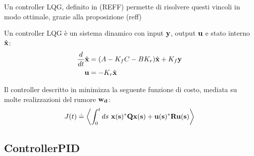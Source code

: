 Un controller \textsc{LQG}, definito in (REFF) permette di risolvere questi vincoli in modo ottimale, grazie
alla proposizione (reff) %
\begin{framed} %
  Un controller \textsc{LQG} è un sistema dinamico con input $\bf y$, output $\bf u$ e stato interno
  $\hat{\bf x}$:
  \begin{equation}\label{eq:lqg}
    \begin{aligned}[c]
      \frac d {dt} \hat {\bf x} &= (A-K_f C - B K_r) \hat{\bf x} + K_f \bf y \\ %
      \bf u               &= -K_r \hat{\bf x}
    \end{aligned}
  \end{equation}
\end{framed}
\begin{framed} %
  Il controller descritto in %
  minimizza la seguente funzione di costo, mediata su molte realizzazioni del rumore $\bf w_d$:
  \begin{equation}\label{eq:lqg-costo}
    J(t) \doteq \left<
      \int_0^t  ds\ \bf{x} (s)^* Q \bf {x} (s) + \bf {u} (s)^* R \bf {u} (s) %
    \right>
  \end{equation}
\end{framed}



\subsection{Controller\textsc{PID}}\label{subsec:intro-pid}
